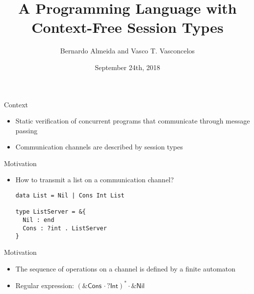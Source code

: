 \documentclass[unknownkeysallowed]{beamer}
\title[A Programming Language with Context-Free Session Types]{A Programming Language with Context-Free Session Types}
\author{Bernardo Almeida and Vasco T. Vasconcelos}
\institute{LASIGE, Faculdade de Ciências, Universidade de Lisboa}
\date{September 24th, 2018}
\begin{document}
\begin{frame}{\null}
  \titlepage 
\end{frame}

\begin{frame}[fragile]{Context}
  \begin{itemize}
  \item Static verification of concurrent programs that communicate through message passing
    \newline
  \item Communication channels are described by session types
  \end{itemize}
\end{frame}

\lstset{language=CFST, numbers=none}
\begin{frame}[fragile]{Motivation}

  \begin{itemize}
  \item How to transmit a list on a communication channel?
    \newline
    

    
\begin{lstlisting}  
data List = Nil | Cons Int List

type ListServer = &{
  Nil : end
  Cons : ?int . ListServer
}
\end{lstlisting}
  \end{itemize}
\end{frame}


\begin{frame}{Motivation}
  \begin{itemize}
    \item The sequence of operations on a channel is defined by a finite automaton
      \newline
      
    \item Regular expression: $(\textsf{\&Cons}\,\cdot\textsf{?Int})^*\cdot\textsf{\&Nil}$
      
  \end{itemize}

\end{frame}
\end{document}
